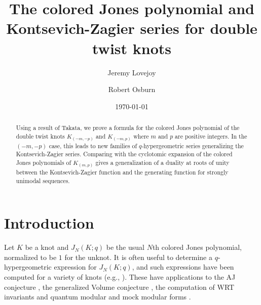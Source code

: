 \documentclass[11pt,reqno]{amsart}
\theoremstyle{definition}
\numberwithin{equation}{section}
\begin{document}
\title[The colored Jones polynomial for double twist knots]{The colored Jones polynomial and Kontsevich-Zagier series for double twist knots}

\author{Jeremy Lovejoy}

\author{Robert Osburn}

\address{CNRS, Universit{\'e} de Paris, Case 7014, 75205 Paris Cedex 13, FRANCE}

\address{School of Mathematics and Statistics, University College Dublin, Belfield, Dublin 4, Ireland}





\date{\today}

\begin{abstract}
Using a result of Takata, we prove a formula for the colored Jones polynomial of the double twist knots $K_{(-m,-p)}$ and $K_{(-m,p)}$ where $m$ and $p$ are positive integers. In the $(-m,-p)$ case, this leads to new families of $q$-hypergeometric series generalizing the Kontsevich-Zagier series. Comparing with the cyclotomic expansion of the colored Jones polynomials of $K_{(m,p)}$ gives a generalization of a duality at roots of unity between the Kontsevich-Zagier function and the generating function for strongly unimodal sequences.     
\end{abstract}

\maketitle

\section{Introduction}
Let $K$ be a knot and $J_{N}(K; q)$ be the usual $N$th colored Jones polynomial, normalized to be $1$ for the unknot. It is often useful to determine a $q$-hypergeometric expression for $J_{N}(K; q)$, and such expressions have been computed for a variety of knots (e.g., \cite{habiro, hikami1, hikami2, thang, masbaum, walsh}).  These have applications to the AJ conjecture \cite{hikami1}, the generalized Volume conjecture \cite{gukov, hikami3}, the computation of WRT invariants \cite{bhl, hikami4} and quantum modular and mock modular forms \cite{folsom, go, hl1, hl2, zagier}.  
\end{document}
